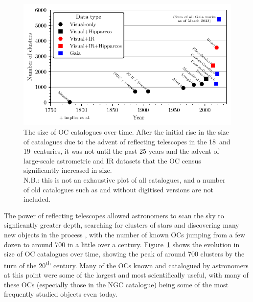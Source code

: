 \begin{figure}[tb]
	\includegraphics[width=\textwidth]{fig/c1/catalogues.pdf}
	\caption[The size of OC catalogues over time]{The size of OC catalogues over time. After the initial rise in the size of catalogues due to the advent of reflecting telescopes in the 18\third\ and 19\third\ centuries, it was not until the past 25 years and the advent of large-scale astrometric and IR datasets that the OC census significantly increased in size. \\
	{\footnotesize N.B.: this is not an exhaustive plot of all catalogues, and a number of old catalogues such as \cite{herschel_catalogue_one_1786} and \cite{herschel_general_catalogue_1864} without digitised versions are not included.}}
	\label{fig:intro:history:catalogues}
\end{figure}

The power of reflecting telescopes allowed astronomers to scan the sky to signficantly greater depth, searching for clusters of stars and discovering many new objects in the process \citep[e.g.][]{herschel_catalogue_one_1786}, with the number of known OCs jumping from a few dozen to around 700 in a little over a century. Figure~\ref{fig:intro:history:catalogues} shows the evolution in size of OC catalogues over time, showing the peak of around 700 clusters by the turn of the 20\textsuperscript{th} century. Many of the OCs known and catalogued by astronomers at this point were some of the largest and most scientifically useful, with many of these OCs (especially those in the NGC catalogue) being some of the most frequently studied objects even today. 


